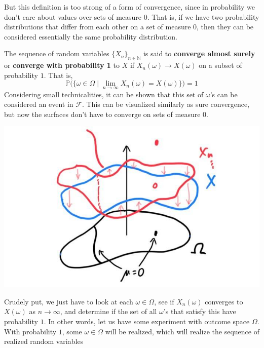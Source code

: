   But this definition is too strong of a form of convergence, since in probability we don't care about values over sets of measure $0$. That is, if we have two probability distributions that differ from each other on a set of measure $0$, then they can be considered essentially the same probability distribution. 

  \begin{definition}
    The sequence of random variables $\{ X_n\}_{n \in \mathbb{N}}$ is said to \textbf{converge almost surely} or \textbf{converge with probability 1} to $X$ if $X_n (\omega) \rightarrow X (\omega)$ on a subset of probability $1$. That is, 
    \begin{equation}
      \mathbb{P} \big( \{ \omega \in \Omega \mid \lim_{n \rightarrow \infty} X_n (\omega) = X(\omega) \} \big) = 1
    \end{equation}
    Considering small technicalities, it can be shown that this set of $\omega$'s can be considered an event in $\mathcal{F}$. This can be visualized similarly as sure convergence, but now the surfaces don't have to converge on sets of measure $0$. 
    \begin{center}
      \includegraphics[scale=0.3]{img/almost_sure_convergence.jpg}
    \end{center}
    Crudely put, we just have to look at each $\omega \in \Omega$, see if $X_n (\omega)$ converges to $X(\omega)$ as $n \rightarrow \infty$, and determine if the set of all $\omega$'s that satisfy this have probability $1$. In other words, let us have some experiment with outcome space $\Omega$. With probability $1$, some $\omega \in \Omega$ will be realized, which will realize the sequence of realized random variables
    \begin{equation}

\end{equation}
\end{definition}
